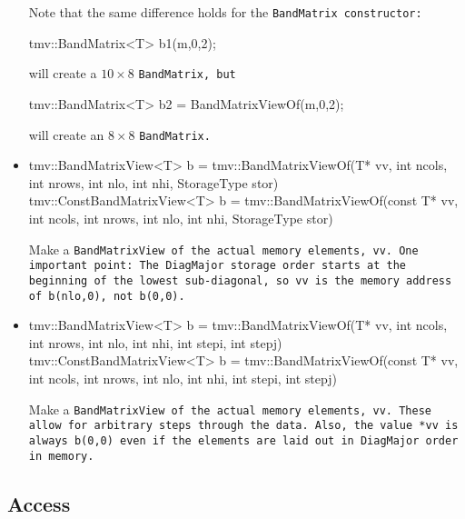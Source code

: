 \begin{itemize}
Note that the same difference holds for the \tt{BandMatrix} constructor:
\begin{tmvcode}
tmv::BandMatrix<T> b1(m,0,2);
\end{tmvcode}
will create a $10 \times 8$ \tt{BandMatrix}, but
\begin{tmvcode}
tmv::BandMatrix<T> b2 = BandMatrixViewOf(m,0,2);
\end{tmvcode}
will create an $8 \times 8$ \tt{BandMatrix}.

\item
\begin{tmvcode}
tmv::BandMatrixView<T> b = 
      tmv::BandMatrixViewOf(T* vv, int ncols, int nrows, 
          int nlo, int nhi, StorageType stor)
tmv::ConstBandMatrixView<T> b = 
      tmv::BandMatrixViewOf(const T* vv, int ncols, int nrows, 
          int nlo, int nhi, StorageType stor)
\end{tmvcode}
Make a \tt{BandMatrixView} of the actual memory elements, \tt{vv}.
One important point: The \tt{DiagMajor} storage order starts at the beginning of the lowest sub-diagonal, so
\tt{vv} is the memory address of \tt{b(nlo,0)}, not \tt{b(0,0)}.

\item
\begin{tmvcode}
tmv::BandMatrixView<T> b = 
      tmv::BandMatrixViewOf(T* vv, int ncols, int nrows, 
          int nlo, int nhi, int stepi, int stepj)
tmv::ConstBandMatrixView<T> b = 
      tmv::BandMatrixViewOf(const T* vv, int ncols, int nrows, 
          int nlo, int nhi, int stepi, int stepj)
\end{tmvcode}
Make a \tt{BandMatrixView} of the actual memory elements, \tt{vv}.
These allow for arbitrary steps through the data.  Also, the value \tt{*vv}
is always \tt{b(0,0)} even if the elements are laid out in \tt{DiagMajor} order in memory.


\end{itemize}

\subsection{Access}
\label{BandMatrix_Access}

